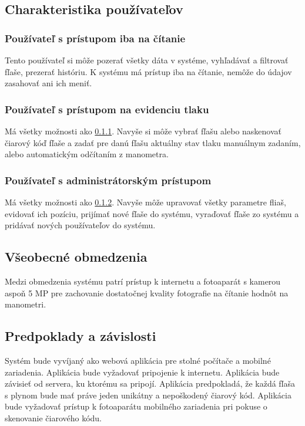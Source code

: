 \documentclass[hreffootnote]{zah}
\begin{document}
\subsection{Charakteristika používateľov}
\label{gen:users}

\subsubsection{Používateľ s prístupom iba na čítanie}
\label{gen:users:ro}

Tento používateľ si môže pozerať všetky dáta v systéme, vyhľadávať a filtrovať fľaše, prezerať históriu. K systému má prístup iba na čítanie, nemôže do údajov zasahovať ani ich meniť.

\subsubsection{Používateľ s prístupom na evidenciu tlaku}
\label{gen:users:meter}

Má všetky možnosti ako \ref{gen:users:ro}. Navyše si môže vybrať fľašu alebo naskenovať čiarový kóď fľaše a zadať pre danú fľašu aktuálny stav tlaku manuálnym zadaním, alebo automatickým odčítaním z manometra.

\subsubsection{Používateľ s administrátorským prístupom}
\label{gen:users:admin}

Má všetky možnosti ako \ref{gen:users:meter}. Navyše môže upravovať všetky parametre fliaš, evidovať ich pozíciu, prijímať nové fľaše do systému, vyraďovať fľaše zo systému a pridávať nových používateľov do systému.

\subsection{Všeobecné obmedzenia}
\label{gen:constraints}

Medzi obmedzenia systému patrí prístup k internetu a fotoaparát s kamerou aspoň 5 MP pre zachovanie dostatočnej kvality fotografie na čítanie hodnôt na manometri. 

\subsection{Predpoklady a závislosti}
\label{gen:deps}

Systém bude vyvíjaný ako webová aplikácia pre stolné počítače a mobilné zariadenia. Aplikácia bude vyžadovať pripojenie k internetu. Aplikácia bude závisieť od servera, ku ktorému sa pripojí. Aplikácia predpokladá, že každá fľaša s plynom bude mať práve jeden unikátny a nepoškodený čiarový kód. Aplikácia bude vyžadovať prístup k fotoaparátu mobilného zariadenia pri pokuse o skenovanie čiarového kódu.
\end{document}
